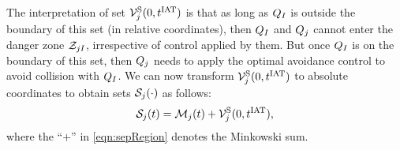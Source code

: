 The interpretation of set $\mathcal{V}^{\text{S}}_{j}(0, t^\text{IAT})$ is that as long as $Q_{I}$ is outside the boundary of this set (in relative coordinates), then $Q_{I}$ and $Q_{j}$ cannot enter the danger zone $\mathcal{Z}_{jI}$, irrespective of control applied by them. But once $Q_{I}$ is on the boundary of this set, then $Q_{j}$ needs to apply the optimal avoidance control to avoid collision with $Q_{I}$. We can now transform $\mathcal{V}^{\text{S}}_{j}(0, t^\text{IAT})$ to absolute coordinates to obtain sets $\mathcal{S}_j(\cdot)$ as follows:
\begin{equation} \label{eqn:sepRegion}
\sep_j(t) = \boset_j(t) + \brs^{\text{S}}_{j}(0, \iat),
\end{equation}
where the ``$+$'' in \eqref{eqn:sepRegion} denotes the Minkowski sum.